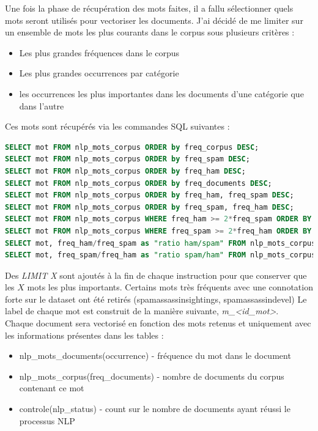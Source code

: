         Une fois la phase de récupération des mots faites, il a fallu sélectionner quels mots seront utilisés pour vectoriser les documents.
        J'ai décidé de me limiter sur un ensemble de mots les plus courants dans le corpus sous plusieurs critères :
        \begin{itemize}
            \item Les plus grandes fréquences dans le corpus
            \item Les plus grandes occurrences par catégorie
            \item les occurrences les plus importantes dans les documents d'une catégorie que dans l'autre
        \end{itemize}
        Ces mots sont récupérés via les commandes SQL suivantes :
        \begin{lstlisting}[title=Commandes SQL pour récupérer les mots les plus présent, language=SQL]
SELECT mot FROM nlp_mots_corpus ORDER by freq_corpus DESC;
SELECT mot FROM nlp_mots_corpus ORDER by freq_spam DESC;
SELECT mot FROM nlp_mots_corpus ORDER by freq_ham DESC;
SELECT mot FROM nlp_mots_corpus ORDER by freq_documents DESC;
SELECT mot FROM nlp_mots_corpus ORDER by freq_ham, freq_spam DESC;
SELECT mot FROM nlp_mots_corpus ORDER by freq_spam, freq_ham DESC;
SELECT mot FROM nlp_mots_corpus WHERE freq_ham >= 2*freq_spam ORDER BY freq_ham DESC;
SELECT mot FROM nlp_mots_corpus WHERE freq_spam >= 2*freq_ham ORDER BY freq_spam DESC;
SELECT mot, freq_ham/freq_spam as "ratio ham/spam" FROM nlp_mots_corpus WHERE freq_ham > 0 AND freq_spam > 0 ORDER BY "ratio ham/spam" DESC;
SELECT mot, freq_spam/freq_ham as "ratio spam/ham" FROM nlp_mots_corpus WHERE freq_ham > 0 AND freq_spam > 0 ORDER BY "ratio spam/ham" DESC;
        \end{lstlisting}
        Des \emph{LIMIT X} sont ajoutés à la fin de chaque instruction pour que conserver que les $X$ mots les plus importants.
        Certains mots très fréquents avec une connotation forte sur le dataset ont été retirés (spamassassinsightings, spamassassindevel)
        Le label de chaque mot est construit de la manière suivante, \emph{m\_<id\_mot>}.\\

        Chaque document sera vectorisé en fonction des mots retenus et uniquement avec les informations présentes dans les tables :
        \begin{itemize}
            \item nlp\_mots\_documents(occurrence) - fréquence du mot dans le document
            \item nlp\_mots\_corpus(freq\_documents) - nombre de documents du corpus contenant ce mot
            \item controle(nlp\_status) - count sur le nombre de documents ayant réussi le processus NLP
        \end{itemize}

